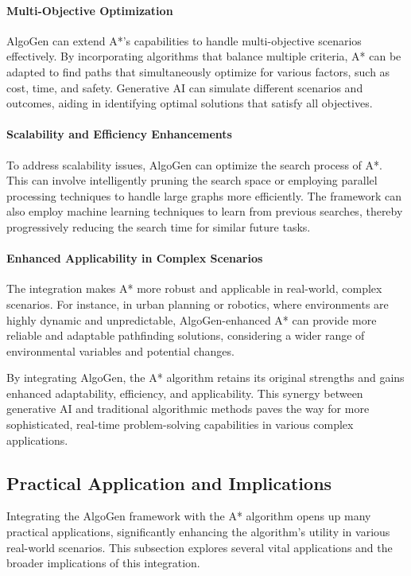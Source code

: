 \documentclass{article}
\begin{document}
\paragraph{Multi-Objective Optimization}
AlgoGen can extend A*'s capabilities to handle multi-objective scenarios effectively. By incorporating algorithms that balance multiple criteria, A* can be adapted to find paths that simultaneously optimize for various factors, such as cost, time, and safety. Generative AI can simulate different scenarios and outcomes, aiding in identifying optimal solutions that satisfy all objectives.

\paragraph{Scalability and Efficiency Enhancements}
To address scalability issues, AlgoGen can optimize the search process of A*. This can involve intelligently pruning the search space or employing parallel processing techniques to handle large graphs more efficiently. The framework can also employ machine learning techniques to learn from previous searches, thereby progressively reducing the search time for similar future tasks.

\paragraph{Enhanced Applicability in Complex Scenarios}
The integration makes A* more robust and applicable in real-world, complex scenarios. For instance, in urban planning or robotics, where environments are highly dynamic and unpredictable, AlgoGen-enhanced A* can provide more reliable and adaptable pathfinding solutions, considering a wider range of environmental variables and potential changes.

By integrating AlgoGen, the A* algorithm retains its original strengths and gains enhanced adaptability, efficiency, and applicability. This synergy between generative AI and traditional algorithmic methods paves the way for more sophisticated, real-time problem-solving capabilities in various complex applications.



\subsection{Practical Application and Implications}

Integrating the AlgoGen framework with the A* algorithm opens up many practical applications, significantly enhancing the algorithm’s utility in various real-world scenarios. This subsection explores several vital applications and the broader implications of this integration.
\end{document}
